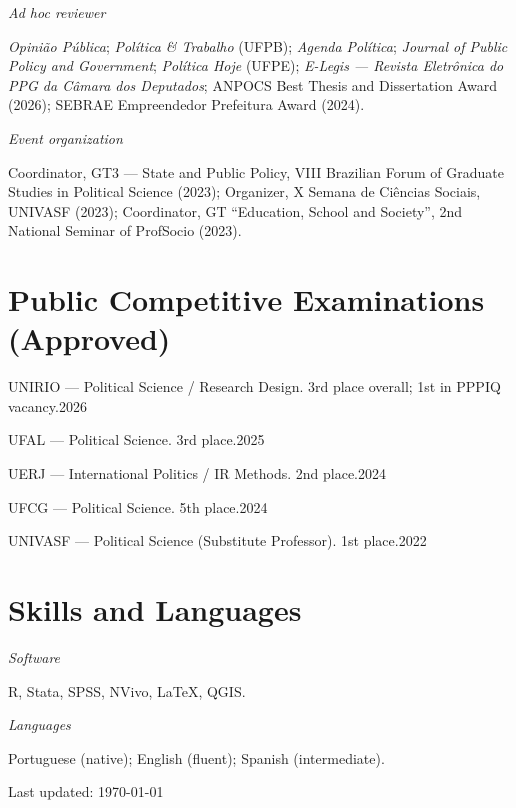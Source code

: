\documentclass[11pt]{article}
\newcommand{\cvsubsection}[1]{\vspace{0.3em}\textit{#1}\par\vspace{0.1em}}
\newcommand{\entryplain}[2]{\noindent#1\hfill #2\par}
\begin{document}
\cvsubsection{Ad hoc reviewer}
\textit{Opinião Pública}; \textit{Política \& Trabalho} (UFPB); \textit{Agenda Política}; \textit{Journal of Public Policy and Government}; \textit{Política Hoje} (UFPE); \textit{E-Legis --- Revista Eletrônica do PPG da Câmara dos Deputados}; ANPOCS Best Thesis and Dissertation Award (2026); SEBRAE Empreendedor Prefeitura Award (2024).

\cvsubsection{Event organization}
Coordinator, GT3 --- State and Public Policy, VIII Brazilian Forum of Graduate Studies in Political Science (2023); Organizer, X Semana de Ciências Sociais, UNIVASF (2023); Coordinator, GT ``Education, School and Society'', 2nd National Seminar of ProfSocio (2023).

\section{Public Competitive Examinations (Approved)}

\entryplain{UNIRIO --- Political Science / Research Design. 3rd place overall; 1st in PPPIQ vacancy.}{2026}
\entryplain{UFAL --- Political Science. 3rd place.}{2025}
\entryplain{UERJ --- International Politics / IR Methods. 2nd place.}{2024}
\entryplain{UFCG --- Political Science. 5th place.}{2024}
\entryplain{UNIVASF --- Political Science (Substitute Professor). 1st place.}{2022}

\section{Skills and Languages}
\cvsubsection{Software}
R, Stata, SPSS, NVivo, \LaTeX, QGIS.

\cvsubsection{Languages}
Portuguese (native); English (fluent); Spanish (intermediate).

\vspace{1em}
\begin{center}
\footnotesize Last updated: \today
\end{center}
\end{document}
